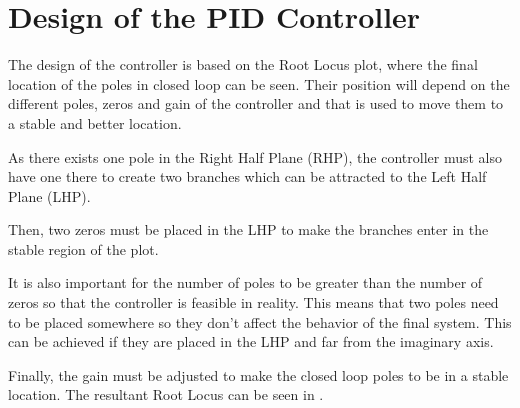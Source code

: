 \section{Design of the PID Controller}\label{designController}
The design of the controller is based on the Root Locus plot, where the final location of the poles in closed loop can be seen. Their position will depend on the different poles, zeros and gain of the controller and that is used to move them to a stable and better location.

As there exists one pole in the Right Half Plane (RHP), the controller must also have one there to create two branches which can be attracted to the Left Half Plane (LHP).

Then, two zeros must be placed in the LHP to make the branches enter in the stable region of the plot.

It is also important for the number of poles to be greater than the number of zeros so that the controller is feasible in reality. This means that two poles need to be placed somewhere so they don't affect the behavior of the final system. This can be achieved if they are placed in the LHP and far from the imaginary axis.

Finally, the gain must be adjusted to make the closed loop poles to be in a stable location. The resultant Root Locus can be seen in .

